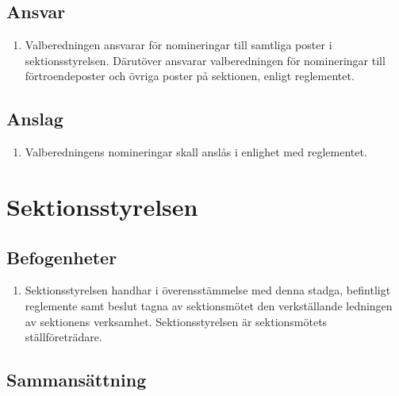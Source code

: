 \documentclass[11pt,a4paper]{article}
\begin{document}
\subsection{Ansvar}

\begin{enumerate}[\thesubsection .1]

  \item Valberedningen ansvarar för nomineringar till samtliga poster
  i sektionsstyrelsen. Därutöver ansvarar valberedningen för
  nomineringar till förtroendeposter och övriga poster på sektionen, enligt
  reglementet.

\end{enumerate}

\subsection{Anslag}

\begin{enumerate}[\thesubsection .1]

  \item Valberedningens nomineringar skall anslås i enlighet med reglementet.

\end{enumerate}


\newpage




\section{Sektionsstyrelsen}
\label{sektionsstyrelsen}
\subsection{Befogenheter}

\begin{enumerate}[\thesubsection .1]

  \item Sektionsstyrelsen handhar i överens\-stäm\-melse med denna stadga, befintligt reglemente samt beslut tagna av sektionsmötet den verk\-ställ\-ande ledningen av sektionens verksamhet. Sektionsstyrelsen är sektions\-mötets ställ\-före\-trädare.

\end{enumerate}

\subsection{Sammansättning}
\end{document}
